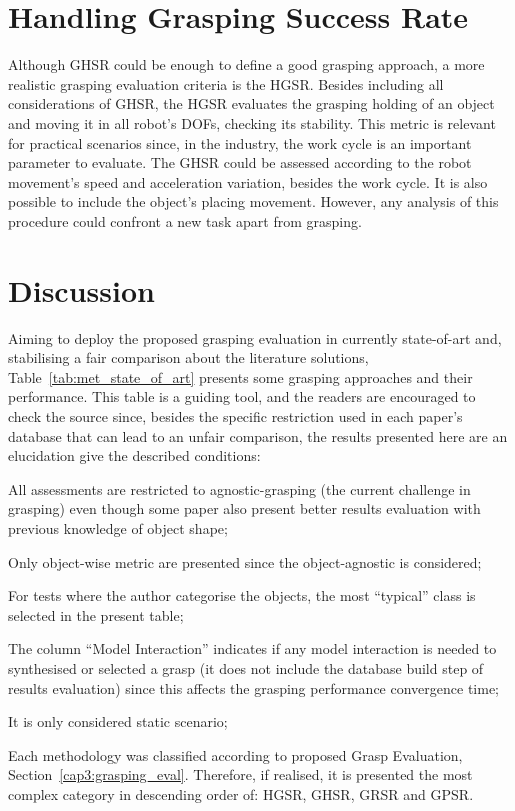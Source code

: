 \section{Handling Grasping Success Rate}
\label{cap3:grasping_eval:sec:hgsr}

Although \ac{GHSR} could be enough to define a good grasping approach, a more realistic grasping evaluation criteria is the \ac{HGSR}.  Besides including all considerations of \ac{GHSR},  the \ac{HGSR} evaluates the grasping holding of an object and moving it in all robot's DOFs, checking its stability. This metric is relevant for practical scenarios since, in the industry, the work cycle is an important parameter to evaluate. The \ac{GHSR} could be assessed according to the robot movement's speed and acceleration variation, besides the work cycle. It is also possible to include the object's placing movement. However, any analysis of this procedure could confront a new task apart from grasping.

\section{Discussion}
\label{cap3:grasping_eval:sec:discussion}

Aiming to deploy the proposed grasping evaluation in currently state-of-art and, stabilising a fair comparison about the literature solutions, Table~\ref{tab:met_state_of_art} presents some grasping approaches and their performance. This table is a guiding tool, and the readers are encouraged to check the source since, besides the specific restriction used in each paper's database that can lead to an unfair comparison, the results presented here are an elucidation give the described conditions: 

\begin{enumerate_jp}
    \item All assessments are restricted to agnostic-grasping (the current challenge in grasping) even though some paper also present better results evaluation with previous knowledge of object shape; 
    \item Only object-wise metric are presented since the object-agnostic is considered;
    \item For tests where the author categorise the objects, the most ``typical'' class is selected in the present table;
    \item The column ``Model Interaction'' indicates if any model interaction is needed to synthesised or selected a grasp (it does not include the database build step of results evaluation) since this affects the grasping performance convergence time;
    \item It is only considered static scenario;
    \item Each methodology was classified according to proposed Grasp Evaluation, Section~\ref{cap3:grasping_eval}. Therefore, if realised, it is presented the most complex category in descending order of: \ac{HGSR}, \ac{GHSR}, \ac{GRSR} and \ac{GPSR}. 
\end{enumerate_jp}


